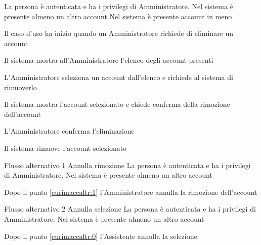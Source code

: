 \tabcuvspace

{}
{La persona è autenticata e ha i privilegi di Amministratore. Nel sistema è presente almeno un altro account}
{Nel sistema è presente account in meno}
{\begin{enumCU}
	\item Il caso d'uso ha inizio quando un Amministratore richiede di eliminare un account
	\item Il sistema mostra all'Amministratore l'elenco degli account presenti \label{curimaccaltr:0}
	\item L'Amministratore seleziona un account dall'elenco e richiede al sistema di rimuoverlo
	\item Il sistema mostra l'account selezionato e chiede conferma della rimozione dell'account \label{curimaccaltr:1}
	\item L'Amministratore conferma l'eliminazione
	\item Il sistema rimuove l'account selezionato
\end{enumCU}}
%
{Flusso alternativo 1}%
{Annulla rimozione}%
{La persona è autenticata e ha i privilegi di Amministratore. Nel sistema è presente almeno un altro account}%
{\postNulle}%
{\begin{enumCU}
		\item Dopo il punto \ref{curimaccaltr:1} l'Amministratore annulla la rimozione dell'account
	\end{enumCU}}%
%	
{Flusso alternativo 2}%
{Annulla selezione}%
{La persona è autenticata e ha i privilegi di Amministratore. Nel sistema è presente almeno un altro account}%
{\postNulle}%
{\begin{enumCU}
		\item Dopo il punto \ref{curimaccaltr:0} l'Assistente annulla la selezione
\end{enumCU}}%

\tabcuvspace

